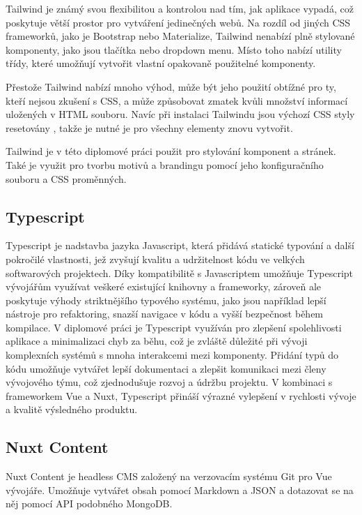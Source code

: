 Tailwind je známý svou flexibilitou a kontrolou nad tím, jak aplikace vypadá, což poskytuje větší prostor pro vytváření jedinečných webů. Na rozdíl od jiných CSS frameworků, jako je Bootstrap nebo Materialize, Tailwind nenabízí plně stylované komponenty, jako jsou tlačítka nebo dropdown menu. Místo toho nabízí utility třídy, které umožňují vytvořit vlastní opakovaně použitelné komponenty.

Přestože Tailwind nabízí mnoho výhod, může být jeho použití obtížné pro ty, kteří nejsou zkušení s CSS, a může způsobovat zmatek kvůli množství informací uložených v HTML souboru. Navíc při instalaci Tailwindu jsou výchozí CSS styly resetovány \cite{TailwindPreflight}, takže je nutné je pro všechny elementy znovu vytvořit.

Tailwind je v této diplomové práci použit pro stylování komponent a stránek. Také je využit pro tvorbu motivů a brandingu pomocí jeho konfiguračního souboru a CSS proměnných.

\subsection{Typescript}
Typescript je nadstavba jazyka Javascript, která přidává statické typování a další pokročilé vlastnosti, jež zvyšují kvalitu a udržitelnost kódu ve velkých softwarových projektech. Díky kompatibilitě s Javascriptem umožňuje Typescript vývojářům využívat veškeré existující knihovny a frameworky, zároveň ale poskytuje výhody striktnějšího typového systému, jako jsou například lepší nástroje pro refaktoring, snazší navigace v kódu a vyšší bezpečnost během kompilace. V diplomové práci je Typescript využíván pro zlepšení spolehlivosti aplikace a minimalizaci chyb za běhu, což je zvláště důležité při vývoji komplexních systémů s mnoha interakcemi mezi komponenty. Přidání typů do kódu umožňuje vytvářet lepší dokumentaci a zlepšit komunikaci mezi členy vývojového týmu, což zjednodušuje rozvoj a údržbu projektu. V kombinaci s frameworkem Vue a Nuxt, Typescript přináší výrazné vylepšení v rychlosti vývoje a kvalitě výsledného produktu. \cite{Typescript}


\subsection{Nuxt Content}
Nuxt Content je headless CMS založený na verzovacím systému Git pro Vue vývojáře. Umožňuje vytvářet obsah pomocí Markdown a JSON a dotazovat se na něj pomocí API podobného MongoDB. \cite{NuxtContent}

